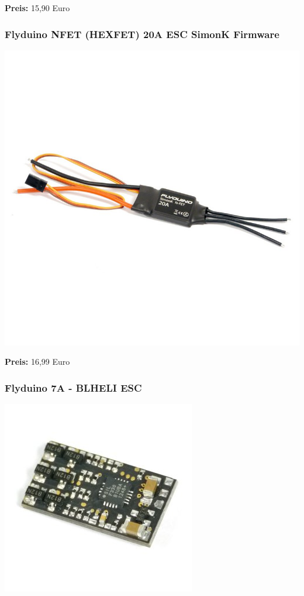 \documentclass[12pt,a4paper]{article}
\begin{document}
\textbf{Preis:} 15,90 Euro

\subsubsection*{Flyduino NFET (HEXFET) 20A ESC SimonK Firmware}
\includegraphics[scale=0.3]{Bilder/ESC20A.jpg}

\textbf{Preis:} 16,99 Euro

\subsubsection*{Flyduino 7A - BLHELI ESC}
\includegraphics[scale=0.4]{Bilder/ESC7A.jpg}
\end{document}
